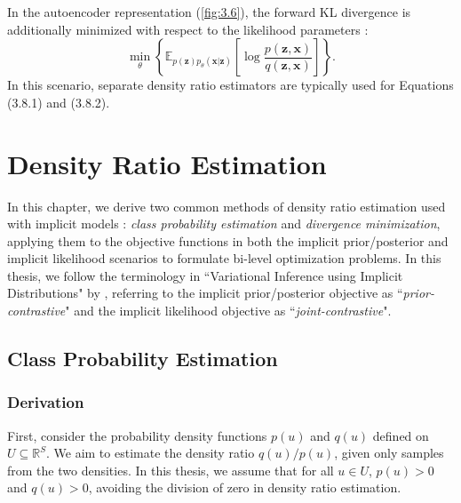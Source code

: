 \documentclass[honours,12pt, twoside]{unswthesis}
\newcommand{\R}{\mathbb{R}}
\numberwithin{equation}{section}
\theoremstyle{definition}
\begin{document}
In the autoencoder representation (\autoref{fig:3.6}), the forward KL divergence is additionally minimized with respect to the likelihood parameters \citep{tiao}:
\begin{equation}
\min_\theta \left\lbrace\mathbb{E}_{p(\bm{z})p_\theta(\bm{x}|\bm{z})}\left[\log \frac{p(\bm{z},\bm{x})}{q(\bm{z},\bm{x})}\right]\right\rbrace.
\end{equation}
In this scenario, separate density ratio estimators are typically used for Equations (3.8.1) and (3.8.2).
\chapter{Density Ratio Estimation}\label{ch4}
In this chapter, we derive two common methods of density ratio estimation used with implicit models \citep{sugiyama, mohamed}: \textit{class probability estimation} and \textit{divergence minimization}, applying them to the objective functions in both the implicit prior/posterior and implicit likelihood scenarios to formulate bi-level optimization problems. In this thesis, we follow the terminology in ``Variational Inference using Implicit Distributions" by \citet{huszar}, referring to the implicit prior/posterior objective as ``\textit{prior-contrastive}" and the implicit likelihood objective as ``\textit{joint-contrastive}".
\section{Class Probability Estimation}\label{sec:4.1}
\subsection{Derivation}\label{sec:4.1.1}
First, consider the probability density functions $p(u)$ and $q(u)$ defined on $U\subseteq \R^S$. We aim to estimate the density ratio $q(u)/p(u)$, given only samples from the two densities. In this thesis, we assume that for all $u\in U$, $p(u)>0$ and $q(u)>0$, avoiding the division of zero in density ratio estimation.
\end{document}
